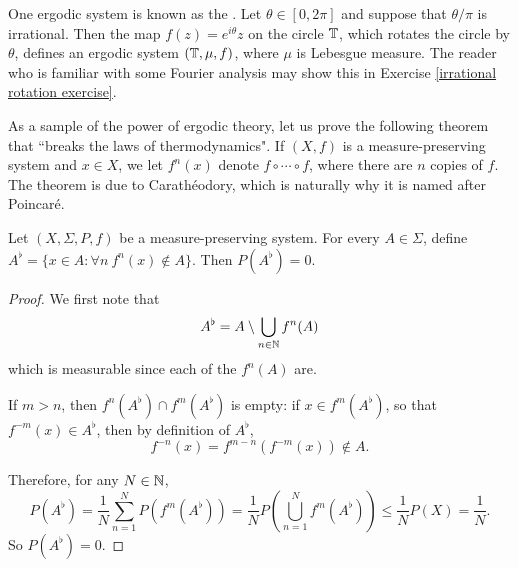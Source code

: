 \begin{example}
One ergodic system is known as the .
Let $\theta \in [0, 2\pi]$ and suppose that $\theta/\pi$ is irrational.
Then the map $f(z) = e^{i\theta}z$ on the circle $\mathbb{T}$, which rotates the circle by $\theta$, defines an ergodic system $(\mathbb{T}, \mu, f)$, where $\mu$ is Lebesgue measure.
The reader who is familiar with some Fourier analysis may show this in Exercise \ref{irrational rotation exercise}.
\end{example}

\begin{subsec}
As a sample of the power of ergodic theory, let us prove the following theorem that ``breaks the laws of thermodynamics".
If $(X, f)$ is a measure-preserving system and $x \in X$, we let $f^n(x)$ denote $f \circ \cdots \circ f$, where there are $n$ copies of $f$.
The theorem is due to Carathéodory, which is naturally why it is named after Poincar\'e.
\end{subsec}

\begin{theorem}
Let $(X, \Sigma, P, f)$ be a measure-preserving system.
For every $A \in \Sigma$, define $A^\flat = \{x \in A: \forall n~f^n(x) \notin A\}$.
Then $P(A^\flat) = 0$.
\end{theorem}
\begin{proof}
We first note that
$$A^\flat = A \setminus \bigcup_{n \in \mathbb{N}} f^n(A)$$
which is measurable since each of the $f^n(A)$ are.

If $m > n$, then $f^n(A^\flat) \cap f^m(A^\flat)$ is empty: if $x \in f^m(A^\flat)$, so that $f^{-m}(x) \in A^\flat$, then by definition of $A^\flat$,
$$f^{-n}(x) = f^{m-n}(f^{-m}(x)) \notin A.$$

Therefore, for any $N \in \mathbb{N}$,
$$P(A^\flat) = \frac{1}{N} \sum_{n=1}^N P(f^m(A^\flat)) = \frac{1}{N} P\left(\bigcup_{n=1}^N f^m(A^\flat)\right) \leq \frac{1}{N} P(X) = \frac{1}{N}.$$
So $P(A^\flat) = 0$.
\end{proof}

